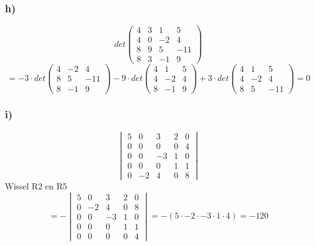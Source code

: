 \documentclass[10pt,a4paper]{article}
\begin{document}
\subsubsection*{h)}
\[ det
\begin{pmatrix}
4 & 3 & 1 & 5\\
4 & 0 & -2 & 4\\
8 & 9 & 5 & -11\\
8 & 3 & -1 & 9
\end{pmatrix}
\]
\[ = -3 \cdot det
\begin{pmatrix}
4 & -2 & 4\\
8 & 5 & -11\\
8 & -1 & 9
\end{pmatrix}
-9 \cdot det 
\begin{pmatrix}
4 & 1 & 5\\
4 & -2 & 4\\
8 & -1 & 9
\end{pmatrix}
+3 \cdot det
\begin{pmatrix}
4 & 1 & 5\\
4 & -2 & 4\\
8 & 5 & -11
\end{pmatrix}
= 0
\]

\subsubsection*{i)}
\[
\begin{vmatrix}
5 & 0 & 3 & 2 & 0\\
0 & 0 & 0 & 0 & 4\\
0 & 0 & -3  & 1 & 0\\
0 & 0 & 0 & 1 & 1\\
0 & -2 & 4 &0  &8
\end{vmatrix}
\]
Wissel R2 en R5
\[
=-
\begin{vmatrix}
5 & 0 & 3 & 2 & 0\\
0 & -2 & 4 &0  &8\\
0 & 0 & -3  & 1 & 0\\
0 & 0 & 0 & 1 & 1\\
0 & 0 & 0 & 0 & 4
\end{vmatrix}
= - (5 \cdot -2 \cdot -3 \cdot 1 \cdot 4) = -120
\]
\end{document}
